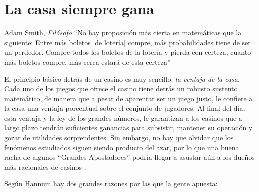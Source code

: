  \section{La casa siempre gana}



\begin{chapquote}{Adam Smith, \textit{Filósofo} \cite{smith1963wealth}}
	``No hay proposición más cierta en matemáticas que la siguiente: Entre más boletos [de lotería] compre, más probabilidades tiene de ser un perdedor. Compre todos los boletos de la lotería y pierda con certeza; cuanto más boletos compre, más cerca estará de esta certeza''
\end{chapquote}



El principio básico detrás de un casino es muy sencillo: \emph{la ventaja de la casa}. Cada uno de los juegos que ofrece el casino tiene detrás un robusto sustento matemático, de manera que a pesar de aparentar ser un juego justo, le confiere a la casa una ventaja porcentual sobre el conjunto de jugadores. Al final del día, esta ventaja y la ley de los grandes números, le garantizan a los casinos que a largo plazo tendrán suficientes ganancias para subsistir, mantener su operación y gozar de utilidades sorprendentes. Sin embargo, no hay que olvidar que los fenómenos estudiados siguen siendo producto del azar, por lo que una buena racha de algunos ``Grandes Apostadores'' podría llegar a asustar aún a los dueños  más racionales de casinos \cite{hannum2005practical}.



Según Hannum \cite{hannum2005practical} hay dos grandes razones por las que la gente apuesta:

